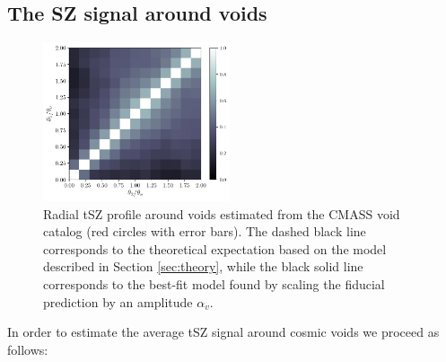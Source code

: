\documentclass[twocolumn,amsfont,amssymb,amsmath, showpacs,balancelastpage, nofootinbib]{revtex4-1}
\begin{document}
    \subsection{The SZ signal around voids}\label{ssec:results.yprof}
      \begin{figure}
        \centering
        \includegraphics[width=0.49\textwidth]{corrmat}
        \caption{Radial tSZ profile around voids estimated from the CMASS void catalog
                 (red circles with error bars). The dashed black line corresponds to
                 the theoretical expectation based on the model described in Section
                 \ref{sec:theory}, while the black solid line corresponds to the
                 best-fit model found by scaling the fiducial prediction by an
                 amplitude $\alpha_v$.}
        \label{fig:corrmat}
      \end{figure}
      In order to estimate the average tSZ signal around cosmic voids we proceed as follows:
\end{document}
